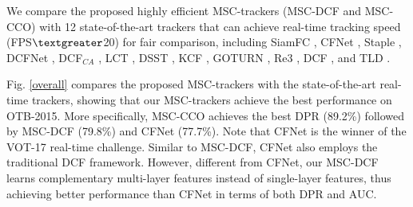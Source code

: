 \documentclass[runningheads]{llncs}
\begin{document}
We compare the proposed highly efficient MSC-trackers (MSC-DCF and MSC-CCO) with 12 state-of-the-art trackers that can achieve real-time tracking speed (FPS$\textgreater$20) for fair comparison, including SiamFC \cite{SiamFC}, CFNet \cite{CFNet}, Staple \cite{Staple}, DCFNet \cite{DCFNet}, {DCF}$_{CA}$ \cite{CACF}, LCT \cite{LCT}, DSST \cite{DSST}, KCF \cite{KCF}, GOTURN \cite{GOTURN}, Re3 \cite{Re3}, DCF \cite{KCF}, and TLD \cite{TLD}.



Fig. \ref{overall} compares the proposed MSC-trackers with the state-of-the-art real-time trackers, showing that our MSC-trackers achieve the best performance on OTB-2015. More specifically, MSC-CCO achieves the best DPR (89.2\%) followed by MSC-DCF (79.8\%) and CFNet (77.7\%). Note that CFNet is the winner of the VOT-17 real-time challenge. Similar to MSC-DCF, CFNet also employs the traditional DCF framework. However, different from CFNet,  our MSC-DCF learns complementary multi-layer features instead of single-layer features, thus achieving better performance than CFNet in terms of both DPR and AUC. 
\end{document}
